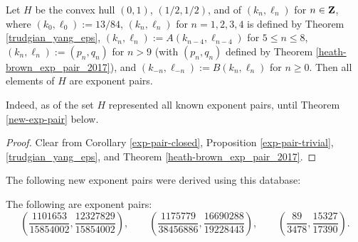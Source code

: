 \begin{corollary}\label{H-pairs}\cite[Theorem 1.3]{trudgian-yang}  Let $H$ be the convex hull $(0,1)$, $(1/2,1/2)$, and of $(k_n,\ell_n)$ for $n \in \mathbf{Z}$, where $(k_0,\ell_0) := 13/84$, $(k_n,\ell_n)$ for $n=1,2,3,4$ is defined by Theorem \ref{trudgian_yang_eps}, $(k_n,\ell_n) := A(k_{n-4},\ell_{n-4})$ for $5 \leq n \leq 8$, $(k_n,\ell_n) := (p_n,q_n)$ for $n > 9$ (with $(p_n,q_n)$ defined by Theorem \ref{heath-brown_exp_pair_2017}), and $(k_{-n},\ell_{-n}) := B(k_n,\ell_n)$ for $n \geq 0$.  Then all elements of $H$ are exponent pairs.
\end{corollary}

Indeed, as of \cite{trudgian-yang} the set $H$ represented all known exponent pairs, until Theorem \ref{new-exp-pair} below.

\begin{proof} Clear from Corollary \ref{exp-pair-closed}, Proposition \ref{exp-pair-trivial}, \ref{trudgian_yang_eps}, and Theorem \ref{heath-brown_exp_pair_2017}.
\end{proof}

The following new exponent pairs were derived using this database:

\begin{theorem}\label{new-exp-pair} The following are exponent pairs:
\[
\left(\frac{1101653}{15854002}, \frac{12327829}{15854002}\right),\qquad \left(\frac{1175779}{38456886}, \frac{16690288}{19228443}\right),\qquad \left(\frac{89}{3478}, \frac{15327}{17390}\right).
\]
\end{theorem}
\derived
{}
